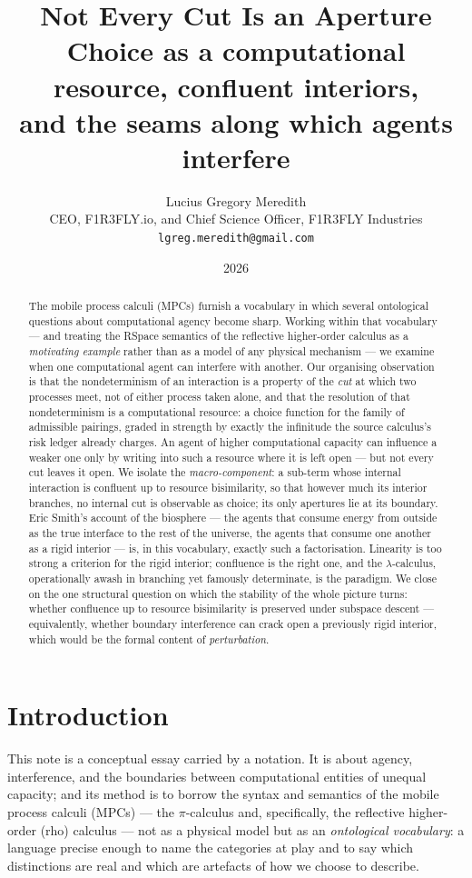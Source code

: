 \documentclass[11pt]{article}
\title{\bfseries Not Every Cut Is an Aperture\\[2pt]
\large Choice as a computational resource, confluent interiors,\\
and the seams along which agents interfere}
\author{Lucius Gregory Meredith\\
\small CEO, F1R3FLY.io, and Chief Science Officer, F1R3FLY Industries\\
\small \texttt{lgreg.meredith@gmail.com}}
\date{2026}
\theoremstyle{definition}
\theoremstyle{plain}
\theoremstyle{remark}
\begin{document}
\maketitle

\begin{abstract}
The mobile process calculi (MPCs) furnish a vocabulary in which several
ontological questions about computational agency become sharp. Working
within that vocabulary --- and treating the RSpace semantics of the
reflective higher-order calculus as a \emph{motivating example} rather than
as a model of any physical mechanism --- we examine when one computational
agent can interfere with another. Our organising observation is that the
nondeterminism of an interaction is a property of the \emph{cut} at which two
processes meet, not of either process taken alone, and that the resolution of
that nondeterminism is a computational resource: a choice function for the
family of admissible pairings, graded in strength by exactly the infinitude
the source calculus's risk ledger already charges. An agent of higher
computational capacity can influence a weaker one only by writing into such a
resource where it is left open --- but not every cut leaves it open. We
isolate the \emph{macro-component}: a sub-term whose internal interaction is
confluent up to resource bisimilarity, so that however much its interior
branches, no internal cut is observable as choice; its only apertures lie at
its boundary. Eric Smith's account of the biosphere --- the agents that
consume energy from outside as the true interface to the rest of the universe,
the agents that consume one another as a rigid interior --- is, in this
vocabulary, exactly such a factorisation. Linearity is too strong a criterion
for the rigid interior; confluence is the right one, and the $\lambda$-calculus,
operationally awash in branching yet famously determinate, is the paradigm.
We close on the one structural question on which the stability of the whole
picture turns: whether confluence up to resource bisimilarity is preserved
under subspace descent --- equivalently, whether boundary interference can
crack open a previously rigid interior, which would be the formal content of
\emph{perturbation}.
\end{abstract}

\section{Introduction}

This note is a conceptual essay carried by a notation. It is about agency,
interference, and the boundaries between computational entities of unequal
capacity; and its method is to borrow the syntax and semantics of the mobile
process calculi (MPCs) --- the $\pi$-calculus and, specifically, the reflective
higher-order (rho) calculus \cite{rho} --- not as a physical model but as an
\emph{ontological vocabulary}: a language precise enough to name the categories
at play and to say which distinctions are real and which are artefacts of how we
choose to describe.
\end{document}
